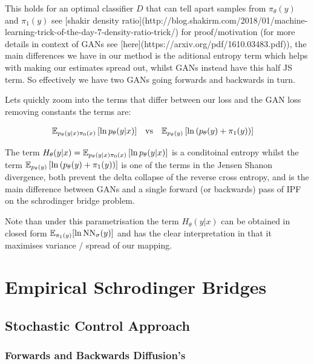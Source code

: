 \documentclass[a4paper,12pt,twoside,openright]{report}
\theoremstyle{definition}
\begin{document}
This holds for an optimal classifier $D$ that can tell apart samples from $\pi_\theta(y)$ and $\pi_1(y)$ see [shakir density ratio](http://blog.shakirm.com/2018/01/machine-learning-trick-of-the-day-7-density-ratio-trick/) for proof/motivation (for more details  in context of GANs see [here](https://arxiv.org/pdf/1610.03483.pdf)), the main differences we have in our method is the aditional entropy term which helps with making our estimates spread out, whilst GANs instead have this half JS term.  So effectively we have two GANs going forwards and backwards in turn.

Lets quickly zoom into the terms that differ between our loss and the GAN loss removing constants the terms are:


\begin{align}
 \mathbb{E}_{p_{\theta}(y|x)\pi_0(x)}\left[ \operatorname{ln} p_{\theta}(y|x) \right]\quad &\text{vs} \quad  \mathbb{E}_{p_{\theta}(y)}\left[\operatorname{ln}\left(p_{\theta}(y) + \pi_1(y)\right)\right]
\end{align}

The term $H_{\theta}(y|x) =\mathbb{E}_{p_{\theta}(y|x)\pi_0(x)}\left[ \operatorname{ln} p_{\theta}(y|x) \right]$ is a conditoinal entropy whilst the term $\mathbb{E}_{p_{\theta}(y)}\left[\operatorname{ln}\left(p_{\theta}(y) + \pi_1(y)\right)\right]$ is one of the terms in the Jensen Shanon divergence, both prevent the delta collapse of the reverse cross entropy, and is the main difference between GANs and a single forward (or backwards) pass of IPF on the schrodinger bridge problem.

 Note than under this parametrisation the term $H_{\theta}(y|x)$ can be obtained in closed form $\mathbb{E}_{\pi_1(y)}[\operatorname{ln} \text{NN}_{\sigma}(y)]$ and has the clear interpretation in that it maximises variance / spread of our mapping.




\chapter{Empirical Schrodinger Bridges}
\section{Stochastic Control Approach}
\subsection{Forwards and Backwards Diffusion's}
\end{document}

